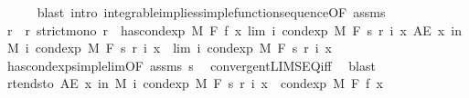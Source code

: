 \begin{isabellebody}
\ \ \ \ \isamarkupfalse%
\ {\isacharparenleft}{\kern0pt}blast\ intro{\isacharcolon}{\kern0pt}\ integrable{\isacharunderscore}{\kern0pt}implies{\isacharunderscore}{\kern0pt}simple{\isacharunderscore}{\kern0pt}function{\isacharunderscore}{\kern0pt}sequence{\isacharbrackleft}{\kern0pt}OF\ assms{\isacharbrackright}{\kern0pt}{\isacharparenright}{\kern0pt}\isanewline
\isanewline
\ \ \isamarkupfalse%
\ r\ \ r{\isacharcolon}{\kern0pt}\ {\isachardoublequoteopen}strict{\isacharunderscore}{\kern0pt}mono\ r{\isachardoublequoteclose}\ \ {\isachardoublequoteopen}has{\isacharunderscore}{\kern0pt}cond{\isacharunderscore}{\kern0pt}exp\ M\ F\ f\ {\isacharparenleft}{\kern0pt}{\isasymlambda}x{\isachardot}{\kern0pt}\ lim\ {\isacharparenleft}{\kern0pt}{\isasymlambda}i{\isachardot}{\kern0pt}\ cond{\isacharunderscore}{\kern0pt}exp\ M\ F\ {\isacharparenleft}{\kern0pt}s\ {\isacharparenleft}{\kern0pt}r\ i{\isacharparenright}{\kern0pt}{\isacharparenright}{\kern0pt}\ x{\isacharparenright}{\kern0pt}{\isacharparenright}{\kern0pt}{\isachardoublequoteclose}\ {\isachardoublequoteopen}AE\ x\ in\ M{\isachardot}{\kern0pt}\ {\isacharparenleft}{\kern0pt}{\isasymlambda}i{\isachardot}{\kern0pt}\ cond{\isacharunderscore}{\kern0pt}exp\ M\ F\ {\isacharparenleft}{\kern0pt}s\ {\isacharparenleft}{\kern0pt}r\ i{\isacharparenright}{\kern0pt}{\isacharparenright}{\kern0pt}\ x{\isacharparenright}{\kern0pt}\ {\isasymlonglonglongrightarrow}\ lim\ {\isacharparenleft}{\kern0pt}{\isasymlambda}i{\isachardot}{\kern0pt}\ cond{\isacharunderscore}{\kern0pt}exp\ M\ F\ {\isacharparenleft}{\kern0pt}s\ {\isacharparenleft}{\kern0pt}r\ i{\isacharparenright}{\kern0pt}{\isacharparenright}{\kern0pt}\ x{\isacharparenright}{\kern0pt}{\isachardoublequoteclose}\isanewline
\ \ \ \ \isamarkupfalse%
\ has{\isacharunderscore}{\kern0pt}cond{\isacharunderscore}{\kern0pt}exp{\isacharunderscore}{\kern0pt}simple{\isacharunderscore}{\kern0pt}lim{\isacharbrackleft}{\kern0pt}OF\ assms\ s{\isacharbrackright}{\kern0pt}\ \isamarkupfalse%
\ convergent{\isacharunderscore}{\kern0pt}LIMSEQ{\isacharunderscore}{\kern0pt}iff\ \isamarkupfalse%
\ blast\isanewline
\ \ \isamarkupfalse%
\ r{\isacharunderscore}{\kern0pt}tendsto{\isacharcolon}{\kern0pt}\ {\isachardoublequoteopen}AE\ x\ in\ M{\isachardot}{\kern0pt}\ {\isacharparenleft}{\kern0pt}{\isasymlambda}i{\isachardot}{\kern0pt}\ cond{\isacharunderscore}{\kern0pt}exp\ M\ F\ {\isacharparenleft}{\kern0pt}s\ {\isacharparenleft}{\kern0pt}r\ i{\isacharparenright}{\kern0pt}{\isacharparenright}{\kern0pt}\ x{\isacharparenright}{\kern0pt}\ {\isasymlonglonglongrightarrow}\ cond{\isacharunderscore}{\kern0pt}exp\ M\ F\ f\ x{\isachardoublequoteclose}\ \isamarkupfalse%

\end{isabellebody}
